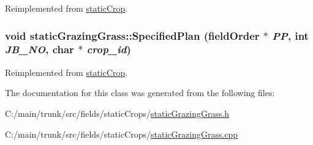 Reimplemented from \hyperlink{classstatic_crop_a4d3d767f569f48eb68ffa76822302467}{staticCrop}.\hypertarget{classstatic_grazing_grass_ae3ecb060781dcf828d748bba9212e48b}{
\subsubsection[{SpecifiedPlan}]{\setlength{\rightskip}{0pt plus 5cm}void staticGrazingGrass::SpecifiedPlan ({\bf fieldOrder} $\ast$ {\em PP}, \/  int {\em JB\_\-NO}, \/  char $\ast$ {\em crop\_\-id})}}
\label{classstatic_grazing_grass_ae3ecb060781dcf828d748bba9212e48b}


Reimplemented from \hyperlink{classstatic_crop_af19d8a1e4f4833325f6712c22ede8b45}{staticCrop}.

The documentation for this class was generated from the following files:\begin{DoxyCompactItemize}
\item 
C:/main/trunk/src/fields/staticCrops/\hyperlink{static_grazing_grass_8h}{staticGrazingGrass.h}\item 
C:/main/trunk/src/fields/staticCrops/\hyperlink{static_grazing_grass_8cpp}{staticGrazingGrass.cpp}\end{DoxyCompactItemize}
